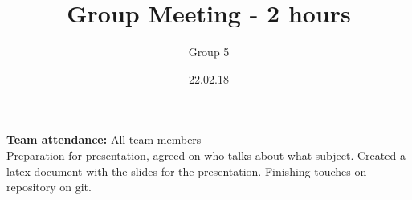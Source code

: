 \documentclass{article}
\title{Group Meeting - 2 hours}
\author{Group 5}
\date{22.02.18}
\begin{document}
	\maketitle
	\noindent
	\textbf{Team attendance:} All team members \\
	
	\noindent
	Preparation for presentation, agreed on who talks about what subject.
	Created a latex document with the slides for the presentation.
	Finishing touches on repository on git. 
\end{document}
